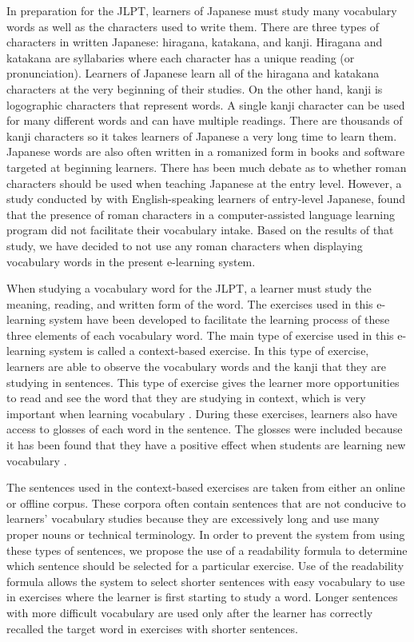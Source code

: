 \documentclass[english]{jnlp_1.4}
\begin{document}
In preparation for the JLPT, learners of Japanese must study many vocabulary words as well as the characters used to write them. There are three types of characters in written Japanese: hiragana, katakana, and kanji. Hiragana and katakana are syllabaries where each character has a unique reading (or pronunciation). Learners of Japanese learn all of the hiragana and katakana characters at the very beginning of their studies. On the other hand, kanji is logographic characters that represent words. A single kanji character can be used for many different words and can have multiple readings. There are thousands of kanji characters so it takes learners of Japanese a very long time to learn them. Japanese words are also often written in a romanized form in books and software targeted at beginning learners. There has been much debate as to whether roman characters should be used when teaching Japanese at the entry level. However, a study conducted by \cite{Article_Okuyama} with English-speaking learners of entry-level Japanese, found that the presence of roman characters in a computer-assisted language learning program did not facilitate their vocabulary intake. Based on the results of that study, we have decided to not use any roman characters when displaying vocabulary words in the present e-learning system.

When studying a vocabulary word for the JLPT, a learner must study the meaning, reading, and written form of the word. The exercises used in this e-learning system have been developed to facilitate the learning process of these three elements of each vocabulary word. The main type of exercise used in this e-learning system is called a context-based exercise. In this type of exercise, learners are able to observe the vocabulary words and the kanji that they are studying in sentences. This type of exercise gives the learner more opportunities to read and see the word that they are studying in context, which is very important when learning vocabulary \cite{Article_Chall}. During these exercises, learners also have access to glosses of each word in the sentence. The glosses were included because it has been found that they have a positive effect when students are learning new vocabulary \cite{Article_Hulstijn}. 

The sentences used in the context-based exercises are taken from either an online or offline corpus. These corpora often contain sentences that are not conducive to learners' vocabulary studies because they are excessively long and use many proper nouns or technical terminology. In order to prevent the system from using these types of sentences, we propose the use of a readability formula to determine which sentence should be selected for a particular exercise. Use of the readability formula allows the system to select shorter sentences with easy vocabulary to use in exercises where the learner is first starting to study a word. Longer sentences with more difficult vocabulary are used only after the learner has correctly recalled the target word in exercises with shorter sentences.
\end{document}
